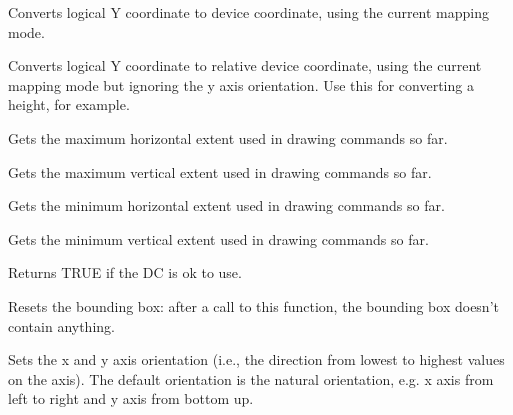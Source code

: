 Converts logical Y coordinate to device coordinate, using the current
mapping mode.

\label{wxdclogicaltodeviceyrel}


Converts logical Y coordinate to relative device coordinate, using the current
mapping mode but ignoring the y axis orientation.
Use this for converting a height, for example.

\label{wxdcmaxx}


Gets the maximum horizontal extent used in drawing commands so far.

\label{wxdcmaxy}


Gets the maximum vertical extent used in drawing commands so far.

\label{wxdcminx}


Gets the minimum horizontal extent used in drawing commands so far.

\label{wxdcminy}


Gets the minimum vertical extent used in drawing commands so far.

\label{wxdcok}


Returns TRUE if the DC is ok to use.

\label{wxdcresetboundingbox}


Resets the bounding box: after a call to this function, the bounding box
doesn't contain anything.



\label{wxdcsetaxisorientation}


Sets the x and y axis orientation (i.e., the direction from lowest to
highest values on the axis). The default orientation is the natural
orientation, e.g. x axis from left to right and y axis from bottom up.

